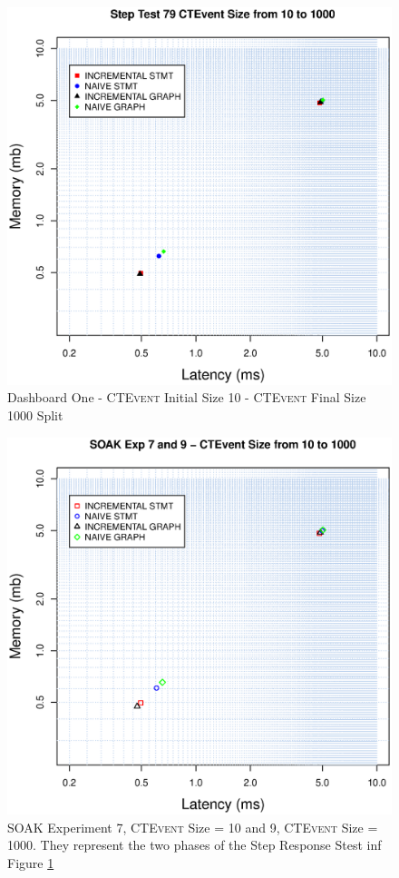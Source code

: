 \begin{figure}[htbp]
	\centering
	\includegraphics[width=\linewidth]{images/level-0-step-dashboard-1}	
	\caption[\textsc{Analyser} Investigation Stack - Level 0 - Step Response Dashboard One -]{Dashboard One - \textsc{CTEvent} Initial Size 10 - \textsc{CTEvent} Final Size 1000 Split} 
	\label{fig:level-0-step-dashboard-1}
\end{figure}
\begin{figure}[htbp]
	\centering
	\includegraphics[width=0.90\linewidth]{images/level-0-step-dashboard-2}	
	\caption[\textsc{Analyser} Investigation Stack - Level 0 - Step Response Dashboard Two - Related Soak Experiments]{SOAK Experiment 7, \textsc{CTEvent} Size = 10 and 9, \textsc{CTEvent} Size = 1000. They represent the two phases of the Step Response Stest inf Figure \ref{fig:level-0-step-dashboard-1}}
	\label{fig:level-0-step-dashboard-2}
\end{figure}

